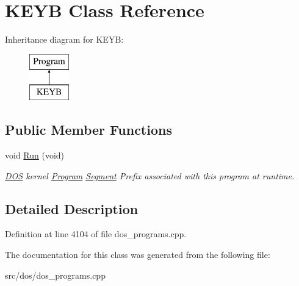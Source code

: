 \hypertarget{classKEYB}{\section{K\-E\-Y\-B Class Reference}
\label{classKEYB}
}
Inheritance diagram for K\-E\-Y\-B\-:\begin{figure}[H]
\begin{center}
\leavevmode
\includegraphics[height=2.000000cm]{classKEYB}
\end{center}
\end{figure}
\subsection*{Public Member Functions}
\begin{DoxyCompactItemize}
\item 
\hypertarget{classKEYB_a0ddb778460bbba0ce194908d8a405d24}{void \hyperlink{classKEYB_a0ddb778460bbba0ce194908d8a405d24}{Run} (void)}\label{classKEYB_a0ddb778460bbba0ce194908d8a405d24}

\begin{DoxyCompactList}\small\item\em \hyperlink{classDOS}{D\-O\-S} kernel \hyperlink{classProgram}{Program} \hyperlink{structSegment}{Segment} Prefix associated with this program at runtime. \end{DoxyCompactList}\end{DoxyCompactItemize}


\subsection{Detailed Description}


Definition at line 4104 of file dos\-\_\-programs.\-cpp.



The documentation for this class was generated from the following file\-:\begin{DoxyCompactItemize}
\item 
src/dos/dos\-\_\-programs.\-cpp\end{DoxyCompactItemize}
